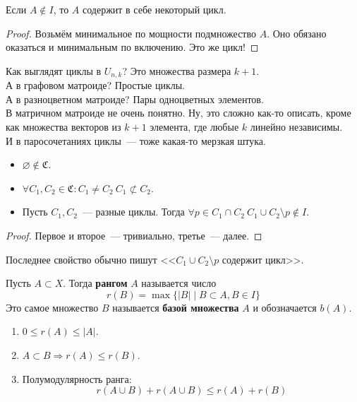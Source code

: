 \documentclass{article}
\begin{document}
    \begin{lemma}
        Если $A\notin I$, то $A$ содержит в себе некоторый цикл.
    \end{lemma}
    \begin{proof}
        Возьмём минимальное по мощности подмножество $A$. Оно обязано оказаться и минимальным по включению. Это же цикл!
    \end{proof}
    \begin{example}
        Как выглядят циклы в $U_{n,k}$? Это множества размера $k+1$.\\
        А в графовом матроиде? Простые циклы.\\
        А в разноцветном матроиде? Пары одноцветных элементов.\\
        В матричном матроиде не очень понятно. Ну, это сложно как-то описать, кроме как множества векторов из $k+1$ элемента, где любые $k$ линейно независимы.\\
        И в паросочетаниях циклы~--- тоже какая-то мерзкая штука.
    \end{example}
    \begin{theorem}
        \mbox{}
        \begin{itemize}
            \item $\varnothing\notin\mathfrak C$.
            \item $\forall C_1,C_2\in\mathfrak C:C_1\neq C_2~C_1\not\subset C_2$.
            \item Пусть $C_1,C_2$~--- разные циклы. Тогда $\forall p\in C_1\cap C_2~C_1\cup C_2\setminus p\notin I$.
        \end{itemize}
    \end{theorem}
    \begin{proof}
        Первое и второе~--- тривиально, третье~--- далее.
    \end{proof}
    \begin{remark}
        Последнее свойство обычно пишут <<$C_1\cup C_2\setminus p$ содержит цикл>>.
    \end{remark}
    \begin{definition}
        Пусть $A\subset X$. Тогда \textbf{рангом} $A$ называется число
        $$
        r(B)=\max\{|B|\mid B\subset A,B\in I\}
        $$
        Это самое множество $B$ называется \textbf{базой множества} $A$ и обозначается $b(A)$.
    \end{definition}
    \begin{theorem}
        \mbox{}
        \begin{enumerate}
            \item $0\leqslant r(A)\leqslant|A|$.
            \item $A\subset B\Rightarrow r(A)\leqslant r(B)$.
            \item Полумодулярность ранга:
            $$r(A\cup B)+r(A\cup B)\leqslant r(A)+r(B)$$
        \end{enumerate}
    \end{theorem}
\end{document}

